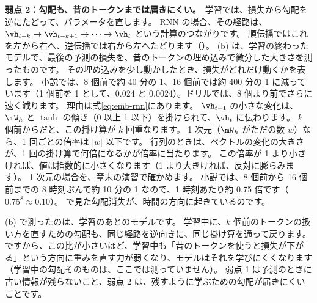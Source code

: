 \textbf{弱点 2：勾配も、昔のトークンまでは届きにくい。}\
学習では、損失から勾配を逆にたどって、パラメータを直します。
RNN の場合、その経路は、$\vh_{t-k}\to\vh_{t-k+1}\to\dots\to\vh_t$ という計算のつながりです。
順伝播ではこれを左から右へ、逆伝播では右から左へたどります（\figref{fig:emb-bptt}）。
(b) は、学習の終わったモデルで、最後の予測の損失を、昔のトークンの埋め込みで微分した大きさを測ったものです。
その埋め込みを少し動かしたとき、損失がどれだけ動くかを表します。
小説では、8 個前で約 40 分の 1、16 個前では約 400 分の 1 に減っています（1 個前を 1 として、0.024 と 0.0024）。ドリルでは、8 個より前でさらに速く減ります。
理由は式\eqref{eq:emb-rnn}にあります。
$\vh_{t-1}$ の小さな変化は、$\mW_h$ と $\tanh$ の傾き（0 以上 1 以下）を掛けられて、$\vh_t$ に伝わります。
$k$ 個前からだと、この掛け算が $k$ 回重なります。
1 次元（$\mW_h$ がただの数 $w$）なら、1 回ごとの倍率は $|w|$ 以下です。
行列のときは、ベクトルの変化の大きさが、1 回の掛け算で何倍になるかが倍率に当たります。
この倍率が 1 より小さければ、値は指数的に小さくなります（1 より大きければ、反対に膨らみます）。
1 次元の場合を、章末の演習で確かめます。
小説では、8 個前から 16 個前までの 8 時刻ぶんで約 10 分の 1 なので、1 時刻あたり約 0.75 倍です（$0.75^8\approx0.10$）。
\chapref{ch:nn}で見た勾配消失が、時間の方向に起きているのです\cite{pascanu2013difficulty}。

(b) で測ったのは、学習のあとのモデルです。
学習中に、$k$ 個前のトークンの扱い方を直すための勾配も、同じ経路を逆向きに、同じ掛け算を通って戻ります。
ですから、この比が小さいほど、学習中も「昔のトークンを使うと損失が下がる」という方向に重みを直す力が弱くなり、モデルはそれを学びにくくなります（学習中の勾配そのものは、ここでは測っていません）。
弱点 1 は予測のときに古い情報が残らないこと、弱点 2 は、残すように学ぶための勾配が届きにくいことです。

